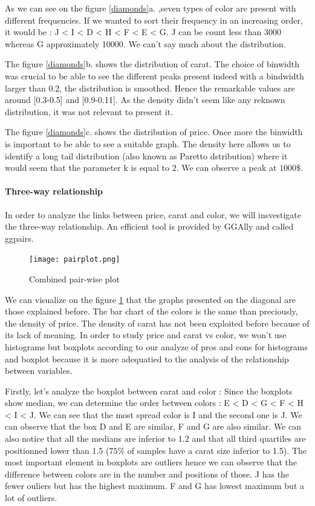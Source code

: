 \documentclass{article}
\begin{document}
As we can see on the figure \ref{diamonds}a. ,seven types of color are present with different frequencies. If we wanted to sort their frequency in an increasing order, it would be : J < I < D < H < F < E < G. J can be count less than 3000 whereas G approximately 10000. We can't say much about the distribution.

The figure \ref{diamonds}b. shows the distribution of carat. The choice of binwidth was crucial to be able to see the different peaks present indeed with a bindwidth larger than 0.2, the distribution is smoothed. Hence the remarkable values are around [0.3-0.5] and [0.9-0.11]. As the density didn't seem like any reknown distribution, it was not relevant to present it.

The figure \ref{diamonds}c. shows the distribution of price. 
Once more the binwidth is important to be able to see a suitable graph. The density here allows us to identify a long tail distribution (also known as Paretto dstribution) where it would seem that the parameter k is equal to 2. We can observe a peak at $1000\$$.

\paragraph{Three-way relationship}

In order to analyze the links between price, carat and color, we will insvestigate the three-way relationship. An efficient tool is provided by GGAlly and called ggpairs.

\begin{figure}[!ht]
\centering
\texttt{[image: pairplot.png]}
 \caption{Combined pair-wise plot}
\label{pairplot}
\end{figure}

We can visualize on the figure \ref{pairplot} that the graphs presented on the diagonal are those explained before. The bar chart of the colors is the same than preciously, the density of price. The density of carat has not been exploited before because of its lack of meaning.
In order to study price and carat vs color, we won't use histograms but boxplots according to our analyze of pros and cons for histograms and boxplot because it is more adequatied to the analysis of the relationship between variables.

Firstly, let's analyze the boxplot between carat and color : 
Since the boxplots show median, we can determine the order between colors :
E < D < G < F < H < I < J. We can see that the most spread color is I and the second one is J. We can observe that the box D and E are similar, F and G are also similar. We can also notice that all the medians are inferior to 1.2 and that all third quartiles are positionned lower than 1.5 ($75\%$ of samples have a carat size inferior to 1.5). The most important element in boxplots are outliers hence we can observe that the difference between colors are in the number and positions of those. J has the fewer ouliers but has the highest maximum. F and G has lowest maximum but a lot of outliers.
\end{document}
